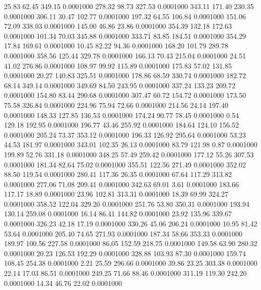   25.83   62.45  349.15   0.0001000
 278.32   98.73  327.53   0.0001000
 343.11  171.40  230.35   0.0001000
 306.11   30.47  102.77   0.0001000
 197.32   64.55  106.84   0.0001000
 151.06   72.09  338.03   0.0001000
 145.00   46.86   23.86   0.0001000
 354.39  132.18  172.63   0.0001000
 101.34   70.03  345.88   0.0001000
 333.71   83.85  184.51   0.0001000
 354.29   17.84  169.61   0.0001000
  10.45   82.22   94.36   0.0001000
 168.20  101.79  289.78   0.0001000
 358.56  125.44  329.78   0.0001000
 166.13   70.43  215.04   0.0001000
  24.51   41.02  276.86   0.0001000
 108.97   99.92  115.89   0.0001000
 175.83   57.02  131.85   0.0001000
  20.27  140.83  325.51   0.0001000
 178.86   68.59  330.74   0.0001000
 182.72   68.14  349.14   0.0001000
 349.69   84.50  243.95   0.0001000
 337.24  133.23  209.72   0.0001000
 154.80   83.44  290.68   0.0001000
 307.47   60.72  154.72   0.0001000
 173.50   75.58  326.84   0.0001000
 224.96   75.94   72.66   0.0001000
 214.56   24.14  197.40   0.0001000
 148.33  127.85  136.53   0.0001000
 174.24   90.77   78.45   0.0001000
   0.54  129.18  192.95   0.0001000
 196.77   43.46  255.92   0.0001000
 184.64  124.10  156.52   0.0001000
 205.24   73.37  353.12   0.0001000
 196.33  126.92  295.64   0.0001000
  53.23   44.53  181.97   0.0001000
 343.01  102.35   26.13   0.0001000
  83.79  121.98    0.87   0.0001000
 199.89   52.76  331.18   0.0001000
 348.25   57.49  259.42   0.0001000
 177.12   55.26  307.53   0.0001000
 181.34   82.64   75.02   0.0001000
 355.51  122.56  271.49   0.0001000
 352.02   88.50  119.54   0.0001000
 280.41  117.36   26.35   0.0001000
  67.64  117.29  313.82   0.0001000
 277.06   71.08  209.41   0.0001000
 342.63   69.01    3.61   0.0001000
 183.66  117.17   18.89   0.0001000
  23.96  102.81  313.31   0.0001000
  18.39   69.99  324.27   0.0001000
 358.52  122.04  329.20   0.0001000
 251.76   53.80  350.31   0.0001000
 193.94  130.14  259.08   0.0001000
  16.14   86.41  144.82   0.0001000
  23.92  135.96  339.67   0.0001000
 326.23   42.18   17.19   0.0001000
 330.26   45.06  206.24   0.0001000
  10.95   81.42   53.64   0.0001000
 205.40   74.65  271.93   0.0001000
 187.34   58.66  353.33   0.0001000
 189.97  100.56  227.58   0.0001000
  86.05  152.59  218.75   0.0001000
 149.58   63.90  280.32   0.0001000
  20.23  126.53  192.29   0.0001000
 328.88  103.93   87.30   0.0001000
 159.74  108.45  254.38   0.0001000
   2.21   25.59  296.66   0.0001000
  39.86   23.25  303.38   0.0001000
  22.14   17.03   86.51   0.0001000
 249.25   71.66   88.46   0.0001000
 311.19  119.30  242.20   0.0001000
  14.34   46.76   22.02   0.0001000
